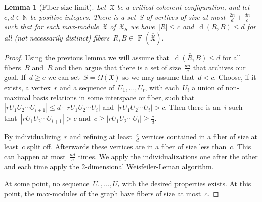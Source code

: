 \documentclass[english,a4paper]{article}
\theoremstyle{plain}
\newtheorem{lemma}      [theorem]{Lemma}
\theoremstyle{definition}
\newcommand{\Nat}{\ensuremath{\mathbb{N}}}
\newcommand{\abs}[1]{| #1 |}
\DeclareMathOperator{\Fibers}{F}
\newcommand{\coherentConfig}{\ensuremath{\mathfrak{X}}}
\newcommand{\fibers}[1]{\ensuremath{\Fibers \left( #1 \right)}}
\newcommand{\minimalDegree}[2]{\Deg(#1,#2)}
\newcommand{\vertices}{\ensuremath{\Omega}}
\DeclareMathOperator{\Deg}{d}
\begin{document}
\begin{lemma}[Fiber size limit]
\label{lem:bound-on-cc-size}
    Let~$\coherentConfig$ be a critical coherent configuration, and let~$c, d \in \Nat$ be positive integers.
    There is a set~$S$ of vertices of size at most~$\frac{2n}{d} + \frac{dn}{c}$ such that for each max-module~$\overline{\coherentConfig}$ of~$\coherentConfig_S$ we have~$\abs{R} \leq c$ and~$\overline{\minimalDegree{R}{B}}\leq d$
     for all (not necessarily distinct) fibers~$R,B \in \fibers{\overline{\coherentConfig}}$.
\end{lemma}
\begin{proof}
    Using the previous lemma we will assume that~$ \overline{\minimalDegree{R}{B}}\leq d$ for all fibers~$B$ and~$R$ and then argue that there is a set of size~$\frac{dn}{c}$ that archives our goal. If~$d\geq c$ we can set~$S=\vertices(\coherentConfig)$ so we may assume that~$d<c$.
    Choose, if it exists, a vertex~$r$ and a sequence  of~$U_1,\ldots,U_t$, with each~$U_i$ a union of non-maximal basis relations  in some interspace or fiber,
    such that~$|rU_1U_2\cdots U_{i+1}|\leq d\cdot |rU_1U_2\cdots U_{i}|$ and~$|rU_1U_2\cdots U_{t}|>c$.
    Then there is an~$i$ such that~$|rU_1U_2\cdots U_{i+1}|> c$ and~$c\geq |rU_1U_2\cdots U_{i}|\geq \frac{c}{d}$.

    By individualizing~$r$ and refining at least~$\frac{c}{d}$ vertices contained in a fiber of size at least~$c$ split off. Afterwards these vertices are in a fiber of size less than~$c$. This can happen at most~$\frac{nd}{c}$ times.
    We apply the individualizations one after the other and each time apply the 2-dimensional Weisfeiler-Leman algorithm.

    At some point, no sequence~$U_1,\ldots,U_t$ with the desired properties exists. At this point, the max-modules of the graph have fibers of size at most~$c$.
\end{proof}
\end{document}
